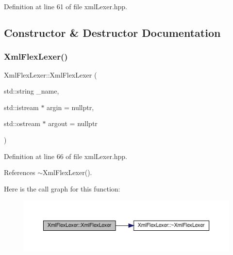 Definition at line 61 of file xml\+Lexer.\+hpp.



\subsection{Constructor \& Destructor Documentation}
\mbox{\label{structXmlFlexLexer_a8afc2bc35a44be59ca80013fb2772468}} 
\subsubsection{\texorpdfstring{Xml\+Flex\+Lexer()}{XmlFlexLexer()}}
{\footnotesize\ttfamily Xml\+Flex\+Lexer\+::\+Xml\+Flex\+Lexer (\begin{DoxyParamCaption}\item[{std\+::string}]{\+\_\+name,  }\item[{std\+::istream $\ast$}]{argin = {\ttfamily nullptr},  }\item[{std\+::ostream $\ast$}]{argout = {\ttfamily nullptr} }\end{DoxyParamCaption})\hspace{0.3cm}{\ttfamily [inline]}}



Definition at line 66 of file xml\+Lexer.\+hpp.



References $\sim$\+Xml\+Flex\+Lexer().

Here is the call graph for this function\+:
\nopagebreak
\begin{figure}[H]
\begin{center}
\leavevmode
\includegraphics[width=350pt]{d4/d3d/structXmlFlexLexer_a8afc2bc35a44be59ca80013fb2772468_cgraph}
\end{center}
\end{figure}
\mbox{\label{structXmlFlexLexer_ad0d2dd2e6a90c700b6769a31d624210b}} 
